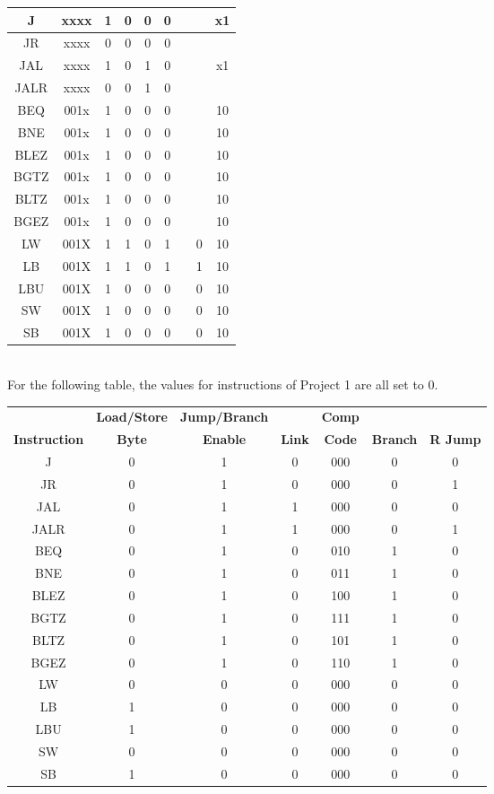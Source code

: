 \documentclass{article}
\begin{document}
\begin{center}
\begin{tabular}{|c|c|c|c|c|c|c|c|c|}
J & xxxx & 1 & 0 & 0 & 0 &&&x1 \\ \hline
JR & xxxx & 0 & 0 & 0 & 0 &&& \\ \hline
JAL & xxxx & 1 & 0 & 1 & 0 &&&x1 \\ \hline
JALR & xxxx & 0 & 0 & 1 & 0 &&& \\ \hline
BEQ & 001x & 1 & 0 & 0 & 0 &&&10 \\ \hline
BNE & 001x & 1 & 0 & 0 & 0 &&&10 \\ \hline
BLEZ& 001x & 1 & 0 & 0 & 0 &&&10 \\ \hline
BGTZ& 001x & 1 & 0 & 0 & 0 &&&10 \\ \hline
BLTZ& 001x & 1 & 0 & 0 & 0 &&&10 \\ \hline
BGEZ& 001x & 1 & 0 & 0 & 0 &&&10 \\ \hline
LW & 001X & 1 & 1 & 0 & 1 &&0& 10 \\ \hline
LB & 001X & 1 & 1 & 0 & 1 &&1& 10 \\ \hline
LBU & 001X & 1 & 0 & 0 & 0 &&0& 10 \\ \hline
SW & 001X & 1 & 0 & 0 & 0 &&0& 10 \\ \hline
SB & 001X & 1 & 0 & 0 & 0 &&0& 10 \\ \hline
\end{tabular} \vspace{2mm}\\
For the following table, the values for instructions of Project 1 are all set to 0.
\begin{tabular}{|c|c|c|c|c|c|c|} \hline
& \textbf{Load/Store} & \textbf{Jump/Branch} && \textbf{Comp} & & \\ 
\textbf{Instruction} & \textbf{Byte} & \textbf{Enable} & \textbf{Link} & \textbf{Code} & \textbf{Branch} & \textbf{R Jump} \\ \hline
J &0& 1 & 0 & 000 & 0 & 0 \\ \hline
JR &0& 1 & 0 & 000 & 0 & 1 \\ \hline
JAL &0& 1 & 1 & 000 & 0 & 0 \\ \hline
JALR &0& 1 & 1 & 000 & 0 & 1 \\ \hline
BEQ &0& 1 & 0 & 010 & 1 & 0 \\ \hline
BNE &0& 1 & 0 & 011 & 1 & 0 \\ \hline
BLEZ &0& 1 & 0 & 100 & 1 & 0 \\ \hline
BGTZ &0& 1 & 0 & 111 & 1 & 0 \\ \hline
BLTZ &0& 1 & 0 & 101 & 1 & 0 \\ \hline
BGEZ &0& 1 & 0 & 110 & 1 & 0 \\ \hline
LW & 0 & 0 & 0  &000& 0&0 \\ \hline
LB & 1 & 0 & 0  &000& 0&0 \\ \hline
LBU & 1 & 0 & 0  &000& 0&0 \\ \hline
SW & 0 & 0 & 0  &000& 0&0 \\ \hline
SB & 1 & 0 & 0 &000& 0&0 \\ \hline
\end{tabular}
\end{center}
\end{document}

